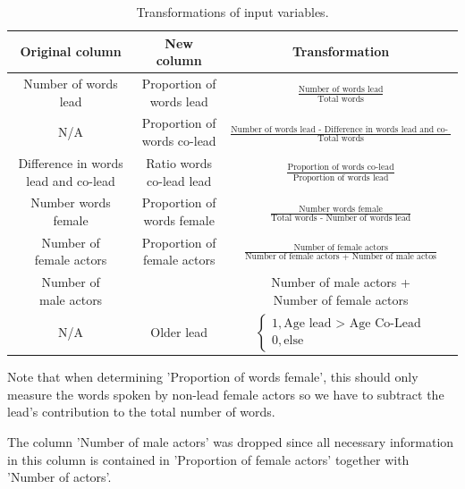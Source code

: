 \documentclass{article}
\begin{document}
\begin{table}[h!]
	\centering
	\begin{tabular}{ccc}
		Original column & New column & Transformation \\
		\midrule
		Number of words lead & \makecell{Proportion of \\ words lead} & $\frac{\text{Number of words lead}}{\text{Total words}}$ \\
		N/A & \makecell{Proportion of \\ words co-lead} & $\frac{\text{Number of words lead - Difference in words lead and co-lead}}{\text{Total words}}$ \\
		\makecell{Difference in words \\ lead and co-lead} & \makecell{Ratio words \\ co-lead lead} & $\frac{\text{Proportion of words co-lead}}{\text{Proportion of words lead}}$ \\
		Number words female & \makecell{Proportion of \\ words female} & $\frac{\text{Number words female}}{\text{Total words - Number of words lead}}$ \\
		\makecell{Number of \\ female actors} & \makecell{Proportion of \\ female actors} & $\frac{\text{Number of female actors}}{\text{Number of female actors + Number of male actos}}$ \\
		\makecell{Number of \\ male actors} & \makecell{Number of actors} & \makecell{Number of male actors + \\ Number of female actors} \\
		N/A & Older lead & $\begin{cases} 1, \text{Age lead > Age Co-Lead} \\ 0, \text{else} \end{cases}$
	\end{tabular}
	\label{tab:transformations}
	\caption{Transformations of input variables.}
\end{table}

Note that when determining 'Proportion of words female', this should only measure the words spoken by non-lead female actors so we have to subtract the lead's contribution to the total number of words.

The column 'Number of male actors' was dropped since all necessary information in this column is contained in 'Proportion of female actors' together with 'Number of actors'.
\end{document}
